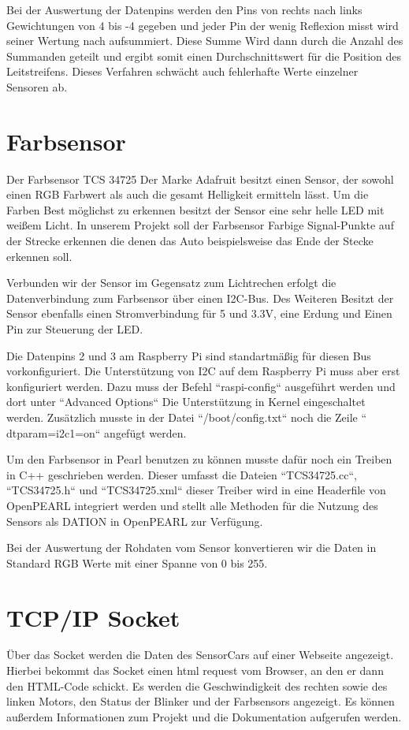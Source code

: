 Bei der Auswertung der Datenpins werden den Pins von rechts nach links Gewichtungen von 4 bis -4 gegeben und jeder Pin der wenig Reflexion misst wird seiner Wertung nach aufsummiert. Diese Summe Wird dann durch die Anzahl des Summanden geteilt und ergibt somit einen Durchschnittswert für die Position des Leitstreifens. Dieses Verfahren schwächt auch fehlerhafte Werte einzelner Sensoren ab.

\section{Farbsensor}
Der Farbsensor TCS 34725 Der Marke Adafruit besitzt einen Sensor, der sowohl einen RGB Farbwert als auch die gesamt Helligkeit ermitteln lässt. Um die Farben Best möglichst zu erkennen besitzt der Sensor eine sehr helle LED mit weißem Licht. In unserem Projekt soll der Farbsensor Farbige Signal-Punkte auf der Strecke erkennen die denen das Auto beispielsweise das Ende der Stecke erkennen soll. 

Verbunden wir der Sensor im Gegensatz zum Lichtrechen erfolgt die Datenverbindung zum Farbsensor über einen I2C-Bus. Des Weiteren Besitzt der Sensor ebenfalls einen Stromverbindung für 5 und 3.3V, eine Erdung und Einen Pin zur Steuerung der LED.

Die Datenpins 2 und 3 am Raspberry Pi sind standartmäßig für diesen Bus vorkonfiguriert. Die Unterstützung von I2C auf dem Raspberry Pi muss aber erst konfiguriert werden. Dazu muss der Befehl “raspi-config“ ausgeführt werden und dort unter “Advanced Options“ Die Unterstützung in Kernel eingeschaltet werden. Zusätzlich musste in der Datei “/boot/config.txt“ noch die Zeile “ dtparam=i2c1=on“ angefügt werden.

Um den Farbsensor in Pearl benutzen zu können musste dafür noch ein Treiben in C++ geschrieben werden. Dieser umfasst die Dateien “TCS34725.cc“, “TCS34725.h“ und “TCS34725.xml“ dieser Treiber wird in eine Headerfile von OpenPEARL integriert werden und stellt alle Methoden für die Nutzung des Sensors als DATION in OpenPEARL zur Verfügung.

Bei der Auswertung der Rohdaten vom Sensor konvertieren wir die Daten in Standard RGB Werte mit einer Spanne von 0 bis 255.

\section{TCP/IP Socket}
Über das Socket werden die Daten des SensorCars auf einer Webseite angezeigt. Hierbei bekommt das Socket einen html request vom Browser, an den er dann den HTML-Code schickt. Es werden die Geschwindigkeit des rechten sowie des linken Motors, den Status der Blinker und der Farbsensors angezeigt. Es können außerdem Informationen zum Projekt und die Dokumentation aufgerufen werden. 

